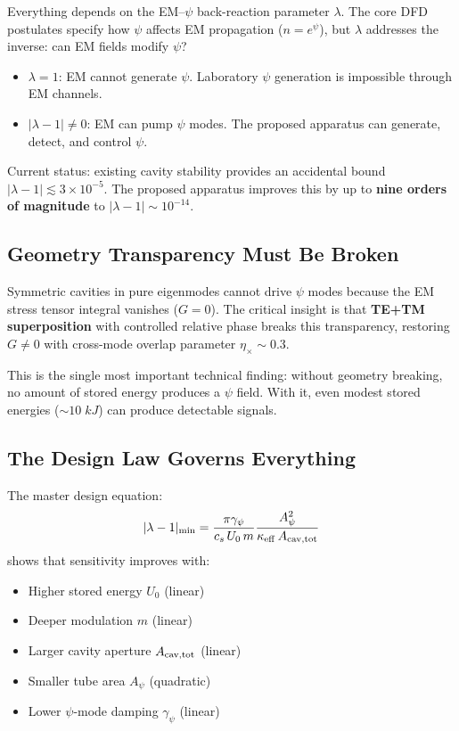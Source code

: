 \documentclass[11pt,a4paper]{article}
\begin{document}
Everything depends on the EM--$\psi$ back-reaction parameter
$\lambda$.  The core DFD postulates specify how $\psi$ affects EM
propagation ($n = e^\psi$), but $\lambda$ addresses the inverse:
can EM fields modify $\psi$?

\begin{itemize}[nosep]
\item $\lambda = 1$: EM cannot generate $\psi$.  Laboratory
$\psi$ generation is impossible through EM channels.
\item $|\lambda - 1| \neq 0$: EM can pump $\psi$ modes.
The proposed apparatus can generate, detect, and control $\psi$.
\end{itemize}

Current status: existing cavity stability provides an accidental
bound $|\lambda - 1| \lesssim 3 \times 10^{-5}$.  The proposed
apparatus improves this by up to \textbf{nine orders of magnitude}
to $|\lambda - 1| \sim 10^{-14}$.

\subsection{Geometry Transparency Must Be Broken}

Symmetric cavities in pure eigenmodes cannot drive $\psi$ modes
because the EM stress tensor integral vanishes ($G = 0$).  The
critical insight is that \textbf{TE+TM superposition} with
controlled relative phase breaks this transparency, restoring
$G \neq 0$ with cross-mode overlap parameter $\eta_\times \sim 0.3$.

This is the single most important technical finding: without
geometry breaking, no amount of stored energy produces a $\psi$
field.  With it, even modest stored energies ($\sim 10\;\si{kJ}$)
can produce detectable signals.

\subsection{The Design Law Governs Everything}

The master design equation:
\begin{equation}
|\lambda - 1|_{\rm min} = \frac{\pi\gamma_\psi}{c_s\,U_0\,m}
\frac{A_\psi^2}{\kappa_{\rm eff}\,A_{\rm cav,tot}}
\end{equation}
shows that sensitivity improves with:
\begin{itemize}[nosep]
\item Higher stored energy $U_0$ (linear)
\item Deeper modulation $m$ (linear)
\item Larger cavity aperture $A_{\rm cav,tot}$ (linear)
\item Smaller tube area $A_\psi$ (quadratic)
\item Lower $\psi$-mode damping $\gamma_\psi$ (linear)
\end{itemize}
\end{document}
